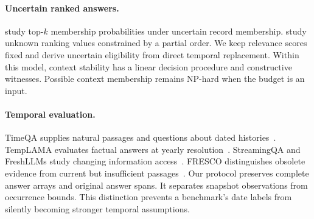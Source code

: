\paragraph{Uncertain ranked answers.}
\citet{hua2008ranking} study top-$k$ membership probabilities under uncertain record membership.
\citet{amarilli2017topk} study unknown ranking values constrained by a partial order.
We keep relevance scores fixed and derive uncertain eligibility from direct temporal replacement.
Within this model, context stability has a linear decision procedure and constructive witnesses.
Possible context membership remains NP-hard when the budget is an input.

\paragraph{Temporal evaluation.}
TimeQA supplies natural passages and questions about dated histories~\citep{chen2021timeqa}.
TempLAMA evaluates factual answers at yearly resolution~\citep{dhingra2022templama}.
StreamingQA and FreshLLMs study changing information access~\citep{liska2022streamingqa,vu2024freshllms}.
FRESCO distinguishes obsolete evidence from current but insufficient passages~\citep{an2026fresco}.
Our protocol preserves complete answer arrays and original answer spans.
It separates snapshot observations from occurrence bounds.
This distinction prevents a benchmark's date labels from silently becoming stronger temporal assumptions.
